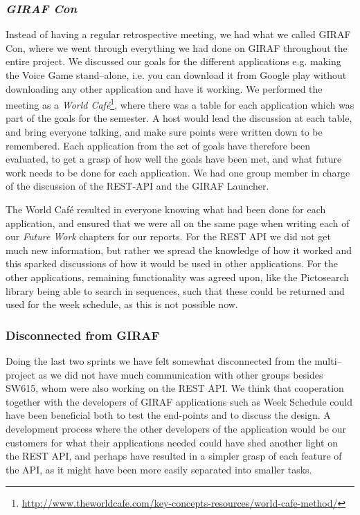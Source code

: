 \subsubsection*{\textit{GIRAF Con}}
Instead of having a regular retrospective meeting, we had what we called GIRAF Con, where we went through everything we had done on GIRAF throughout the entire project.
We discussed our goals for the different applications e.g. making the Voice Game stand--alone, i.e. you can download it from Google play without downloading any other application and have it working.
We performed the meeting as a \textit{World Café}\footnote{\url{http://www.theworldcafe.com/key-concepts-resources/world-cafe-method/}}, where there was a table for each application which was part of the goals for the semester.
A host would lead the discussion at each table, and bring everyone talking, and make sure points were written down to be remembered.
Each application from the set of goals have therefore been evaluated, to get a grasp of how well the goals have been met, and what future work needs to be done for each application.
We had one group member in charge of the discussion of the REST-API and the GIRAF Launcher.

The World Café resulted in everyone knowing what had been done for each application, and ensured that we were all on the same page when writing each of our \textit{Future Work} chapters for our reports.
For the REST API we did not get much new information, but rather we spread the knowledge of how it worked and this sparked discussions of how it would be used in other applications.
For the other applications, remaining functionality was agreed upon, like the Pictosearch library being able to search in sequences, such that these could be returned and used for the week schedule, as this is not possible now.

\subsubsection*{Disconnected from GIRAF}
Doing the last two sprints we have felt somewhat disconnected from the multi--project as we did not have much communication with other groups besides SW615, whom were also working on the REST API.
We think that cooperation together with the developers of GIRAF applications such as Week Schedule could have been beneficial both to test the end-points and to discuss the design.
A development process where the other developers of the application would be our customers for what their applications needed could have shed another light on the REST API, and perhaps have resulted in a simpler grasp of each feature of the API, as it might have been more easily separated into smaller tasks.

